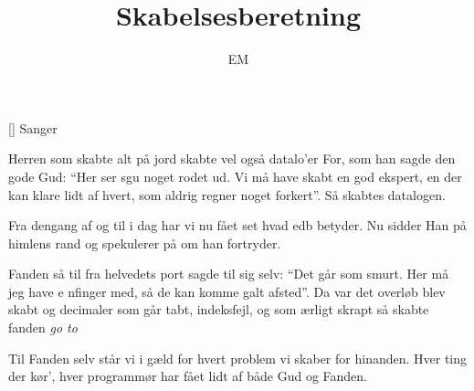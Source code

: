\documentclass[a4paper,11pt]{article}
\title{Skabelsesberetning}
\author{EM}
\begin{document}
\maketitle

\begin{roles}
[] Sanger
\end{roles}

\begin{song}
Herren som skabte alt på jord
skabte vel også datalo'er
For, som han sagde den gode Gud:
"`Her ser sgu noget rodet ud.
Vi må have skabt en god ekspert,
en der kan klare lidt af hvert,
som aldrig regner noget forkert"'.
Så skabtes datalogen.

Fra dengang af
og til i dag
har vi nu fået set hvad edb betyder.
Nu sidder Han
på himlens rand
og spekulerer på om han fortryder.

Fanden så til fra helvedets port
sagde til sig selv: "`Det går som smurt.
Her må jeg have e nfinger med,
så de kan komme galt afsted"'.
Da var det overløb blev skabt
og decimaler som går tabt,
indeksfejl, og som ærligt skrapt
så skabte fanden {\em go to}

Til Fanden selv
står vi i gæld
for hvert problem vi skaber for hinanden.
Hver ting der kør',
hver programmør
har fået lidt af både Gud og Fanden.
\end{song}
\end{document}
